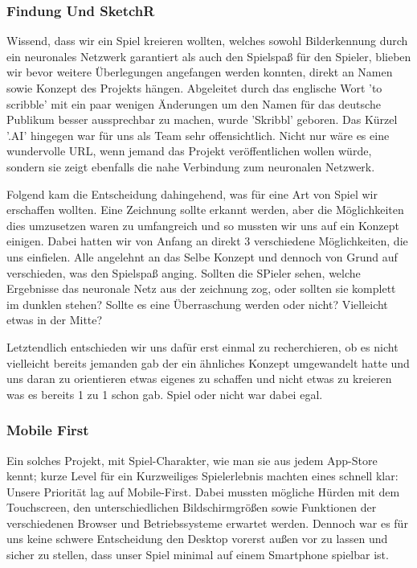 \documentclass[11pt]{article}
\begin{document}
\subsubsection{Findung Und SketchR}

Wissend, dass wir ein Spiel kreieren wollten, welches sowohl Bilderkennung durch ein neuronales Netzwerk garantiert als auch den Spielspaß für den Spieler, blieben wir bevor weitere Überlegungen angefangen werden konnten, direkt an Namen sowie Konzept des Projekts hängen.
Abgeleitet durch das englische Wort 'to scribble' mit ein paar wenigen Änderungen um den Namen für das deutsche Publikum besser aussprechbar zu machen, wurde 'Skribbl' geboren. Das Kürzel '.AI' hingegen war für uns als Team sehr offensichtlich. Nicht nur wäre es eine wundervolle URL, wenn jemand das Projekt veröffentlichen wollen würde, sondern sie zeigt ebenfalls die nahe Verbindung zum neuronalen Netzwerk.

Folgend kam die Entscheidung dahingehend, was für eine Art von Spiel wir erschaffen wollten. Eine Zeichnung sollte erkannt werden, aber die Möglichkeiten dies umzusetzen waren zu umfangreich und so mussten wir uns auf ein Konzept einigen. Dabei hatten wir von Anfang an direkt 3 verschiedene Möglichkeiten, die uns einfielen. Alle angelehnt an das Selbe Konzept und dennoch von Grund auf verschieden, was den Spielspaß anging. Sollten die SPieler sehen, welche Ergebnisse das neuronale Netz aus der zeichnung zog, oder sollten sie komplett im dunklen stehen? Sollte es eine Überraschung werden oder nicht? Vielleicht etwas in der Mitte?

Letztendlich entschieden wir uns dafür erst einmal zu recherchieren, ob es nicht vielleicht bereits jemanden gab der ein ähnliches Konzept umgewandelt hatte und uns daran zu orientieren etwas eigenes zu schaffen und nicht etwas zu kreieren was es bereits 1 zu 1 schon gab. Spiel oder nicht war dabei egal.

\subsubsection{Mobile First}

Ein solches Projekt, mit Spiel-Charakter, wie man sie aus jedem App-Store kennt; kurze Level für ein Kurzweiliges Spielerlebnis machten eines schnell klar: Unsere Priorität lag auf Mobile-First.
Dabei mussten mögliche Hürden mit dem Touchscreen, den unterschiedlichen Bildschirmgrößen sowie Funktionen der verschiedenen Browser und Betriebssysteme erwartet werden. Dennoch war es für uns keine schwere Entscheidung den Desktop vorerst außen vor zu lassen und sicher zu stellen, dass unser Spiel minimal auf einem Smartphone spielbar ist.
\end{document}
